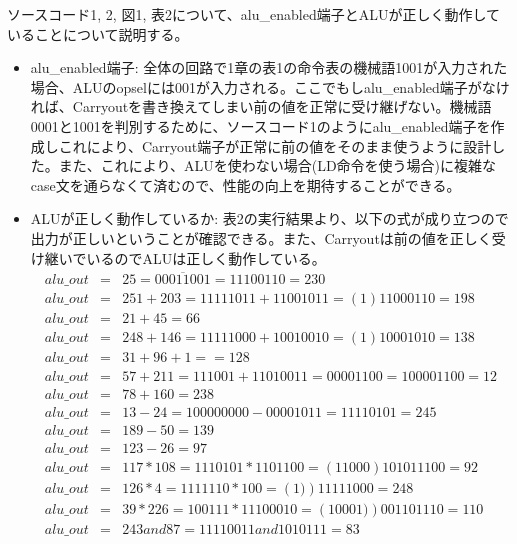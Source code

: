\documentclass[12pt]{jreport}
\begin{document}
        ソースコード1, 2, 図1, 表2について、alu\_enabled端子とALUが正しく動作していることについて説明する。
        \begin{itemize}
            \item alu\_enabled端子: 全体の回路で1章の表1の命令表の機械語1001が入力された場合、ALUのopselには001が入力される。ここでもしalu\_enabled端子がなければ、Carryoutを書き換えてしまい前の値を正常に受け継げない。機械語0001と1001を判別するために、ソースコード1のようにalu\_enabled端子を作成しこれにより、Carryout端子が正常に前の値をそのまま使うように設計した。また、これにより、ALUを使わない場合(LD命令を使う場合)に複雑なcase文を通らなくて済むので、性能の向上を期待することができる。 \newpage

            \item ALUが正しく動作しているか: 表2の実行結果より、以下の式が成り立つので出力が正しいということが確認できる。また、Carryoutは前の値を正しく受け継いでいるのでALUは正しく動作している。
            \begin{eqnarray*}
                alu\_out &=& 25 = \overline{00011001} = 11100110 = 230\\
                alu\_out &=& 251 + 203 = 11111011 + 11001011 = \left(1\right)11000110 = 198\\
                alu\_out &=& 21 + 45 = 66\\    
                alu\_out &=& 248 + 146 = 11111000 + 10010010 = \left(1\right)10001010 = 138\\
                alu\_out &=& 31 + 96 + 1 == 128\\
                alu\_out &=& 57 + 211 = 111001 + 11010011 = 00001100 = 100001100 = 12\\
                alu\_out &=& 78 + 160 = 238\\
                alu\_out &=& 13 - 24 = 100000000 - 00001011 = 11110101 = 245\\
                alu\_out &=& 189 - 50 = 139\\
                alu\_out &=& 123 - 26 = 97\\
                alu\_out &=& 117 * 108 = 1110101 * 1101100 = \left(11000\right)101011100 = 92\\
                alu\_out &=& 126 * 4  = 1111110 * 100 = \left(1)\right)11111000 = 248\\
                alu\_out &=& 39 * 226 = 100111 * 11100010 = \left(10001)\right)001101110 = 110\\
                alu\_out &=& 243 and 87 = 11110011 and 1010111 = 83\\

\end{eqnarray*}
\end{itemize}
\end{document}
